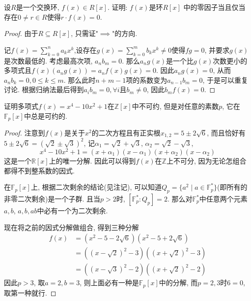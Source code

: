 \begin{problem}
    设$R$是一个交换环, $f(x) \in R[x]$. 证明: $f(x)$是环$R[x]$
中的零因子当且仅当存在$0 \neq r \in R$使得$r \cdot f(x) = 0$.
\end{problem}

\begin{proof}
    由于$R \subseteq R[x]$, 只需证"$\implies$"的方向.

    记$f(x) = \sum_{k = 0}^{n} a_kx^k$,设存在$g(x) = \sum_{k = 0}^{m} b_kx^k \neq 0$使得$fg = 0$, 并要求$g(x)$是次数最低的. 考虑最高次项, $a_nb_m = 0$. 那么$a_ng(x)$是一个比$g(x)$次数更小的多项式且$f(x)(a_ng(x)) = a_nf(x)g(x) = 0$. 因此$a_ng(x) = 0$, 从而$a_nb_k = 0, 0 \leqslant k \leqslant m$. 那么此时$n + m - 1$项的系数变为$a_{n - 1}b_m = 0$, 于是可以重复讨论. 根据归纳法最后得到$a_ib_m = 0, \forall i$且$b_m \neq 0$, 因此$b_mf(x) = 0$.
\end{proof}

\begin{problem}
    证明多项式$f(x) = x^4 - 10x^2 + 1$在$\mathbb{Z}[x]$中不可约, 
但是对任意的素数$p$, 它在$\mathbb{F}_p[x]$中总是可约的.
\end{problem}

\begin{proof}
    注意到$f(x)$是关于$x^2$的二次方程且有正实根$x_{1,2} =  5 \pm 2\sqrt{6}$, 而且恰好有$5 \pm 2\sqrt{6} = (\sqrt{2} \pm \sqrt{3})^2$, 记$\alpha_1 = \sqrt{2} + \sqrt{3}$, $\alpha_2 = \sqrt{2} - \sqrt{3}$,
    \[
        x^4 - 10x^2 + 1 = (x + \alpha_1)(x - \alpha_1)(x + \alpha_2)(x - \alpha_2)
    \]
    这是一个$\mathbb{R}[x]$上的唯一分解. 因此可以得到$f(x)$在$\mathbb{Z}$上不可分, 因为无论怎组合都得不到整系数的因式.

    在$\mathbb{F}_p[x]$上, 根据二次剩余的结论(见注记), 可以知道$Q_p = \{a^2 \mid a \in \mathbb{F}_p^*\}$(即所有的非零二次剩余)是一个子群. 且当$p > 2$时, $[\mathbb{F}_p^*:Q_p] = 2$. 那么对$\mathbb{F}_p^*$中任意两个元素$a, b$, $a, b, ab$中必有一个为二次剩余.

    现在将之前的因式分解做组合, 得到三种分解
    \[
    \begin{aligned}
        f(x) &= (x^2 - 5 - 2\sqrt{6})(x^2 - 5 + 2\sqrt{6})\\
        &= ((x - \sqrt{2})^2 - 3)((x + \sqrt{2})^2 - 3)\\
        &= ((x - \sqrt{3})^2 - 2)((x + \sqrt{2})^2 - 2)
    \end{aligned}
    \]
    因此$p > 3$, 取$a = 2, b = 3$, 则上面必有一种是$\mathbb{F}_p[x]$中的分解, 而$p = 2, 3$时$6 = 0$, 取第一种就行.
\end{proof}

